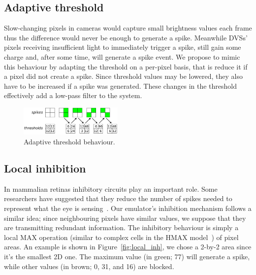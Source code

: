 \documentclass[conference]{IEEEtran}
\begin{document}
\subsection{Adaptive threshold}
\label{sec:adaptive_thresh}
Slow-changing pixels in cameras would capture small brightness values each frame thus the difference would never be enough to generate a spike. Meanwhile DVSs' pixels receiving insufficient light to immediately trigger a spike, still gain some charge and, after some time, will generate a spike event. We propose to mimic this behaviour by adapting the threshold on a per-pixel basis, that is reduce it if a pixel did not create a spike. Since threshold values may be lowered, they also have to be increased if a spike was generated. These changes in the threshold effectively add a low-pass filter to the system. 

%
\begin{figure}[hbt]
  \centering
  \includegraphics[width=0.45\textwidth]{adaptive_thresh_boxes}
  \caption{Adaptive threshold behaviour.}
  \label{fig:adpt_thresh}
\end{figure}

\subsection{Local inhibition}
\label{sec:local_inhibition}
In mammalian retinas inhibitory circuits play an important role. Some researchers have suggested that they reduce the number of spikes needed to represent what the eye is sensing~\cite{basab}. Our emulator's inhibition mechanism follows a similar idea; since neighbouring pixels have similar values, we suppose that they are transmitting redundant information. The inhibitory behaviour is simply a local MAX operation (similar to complex cells in the HMAX model~\cite{riesenhuber1999hierarchical}) of pixel areas. An example is shown in Figure~\ref{fig:local_inh}, we chose a 2-by-2 area since it's the smallest 2D one. The maximum value (in green; 77) will generate a spike, while other values (in brown; 0, 31, and 16) are blocked.
\end{document}
